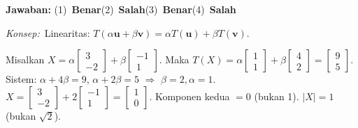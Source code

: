 \documentclass[11pt]{article}
\newcommand{\jawaban}[1]{%
  \noindent\colorbox{gold!30}{\parbox{\dimexpr\linewidth-2\fboxsep\relax}{%
    \textbf{Jawaban:} #1}}\par\smallskip}
\newcommand{\konsep}{\noindent\textit{Konsep:}\ \ignorespaces}
\begin{document}
\begin{pembox}
\jawaban{(1)~\textbf{Benar}\quad(2)~\textbf{Salah}\quad(3)~\textbf{Benar}\quad(4)~\textbf{Salah}}
\konsep Linearitas: $T(\alpha\mathbf{u}+\beta\mathbf{v})=\alpha T(\mathbf{u})+\beta T(\mathbf{v})$.

Misalkan $X=\alpha\begin{bmatrix}3\\-2\end{bmatrix}+\beta\begin{bmatrix}-1\\1\end{bmatrix}$. Maka $T(X)=\alpha\begin{bmatrix}1\\1\end{bmatrix}+\beta\begin{bmatrix}4\\2\end{bmatrix}=\begin{bmatrix}9\\5\end{bmatrix}$.
Sistem: $\alpha+4\beta=9$, $\alpha+2\beta=5$ $\Rightarrow$ $\beta=2,\alpha=1$.
$X=\begin{bmatrix}3\\-2\end{bmatrix}+2\begin{bmatrix}-1\\1\end{bmatrix}=\begin{bmatrix}1\\0\end{bmatrix}$.
Komponen kedua $=0$ (bukan 1). $|X|=1$ (bukan $\sqrt{2}$).
\end{pembox}
\end{document}
